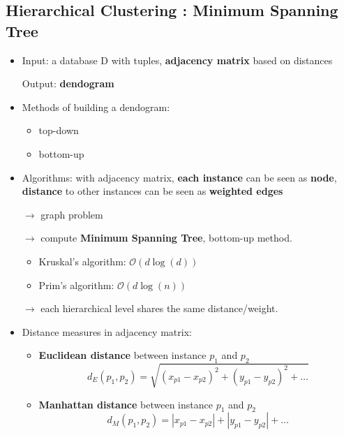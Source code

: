 \subsection{Hierarchical Clustering : Minimum Spanning Tree}
\begin{itemize}
	\item Input: a database D with tuples, \textbf{adjacency matrix} based on distances
	
	Output: \textbf{dendogram}
	\item Methods of building a dendogram: 
	\begin{itemize}
		\item top-down
		\item bottom-up
	\end{itemize}
	\item Algorithms: with adjacency matrix, \textbf{each instance} can be seen as \textbf{node}, \textbf{distance} to other instances can be seen as \textbf{weighted edges} 
	
	$\rightarrow$ graph problem
	
	$\rightarrow$ compute \textbf{Minimum Spanning Tree}, bottom-up method.
	\begin{itemize}
		\item Kruskal's algorithm: $\mathcal{O}(d\log(d))$
		\item Prim's algorithm: $\mathcal{O}(d\log(n))$
	\end{itemize}
	$\rightarrow$ each hierarchical level shares the same distance/weight.
	
	\item Distance measures in adjacency matrix:
	\begin{itemize}
		\item \textbf{Euclidean distance} between instance $p_1$ and $p_2$
		$$d_E(p_1,p_2) = \sqrt{(x_{p1} - x_{p2})^2 + (y_{p1} - y_{p2})^2 +\dots }$$
		\item \textbf{Manhattan distance} between instance $p_1$ and $p_2$
		$$d_M(p_1,p_2) = |x_{p1} - x_{p2}| + |y_{p1} - y_{p2}| + \dots$$
	\end{itemize}
\end{itemize}

